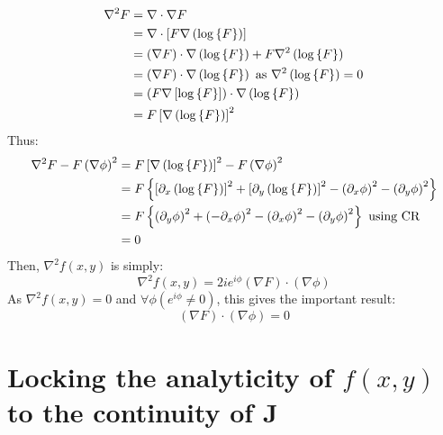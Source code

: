 \documentclass{article}
\begin{document}
\begin{align}
    \nabla^2 F &= \nabla \cdot \nabla F \\
               &= \nabla \cdot \left[ F \nabla \left( \log \left\{ F \right\} \right) \right]
    \\
    &= \left( \nabla F \right) \cdot \nabla \left( \log \left\{ F \right\} \right) + F \nabla^2
    \left( \log \left\{ F \right\} \right) \\
    &= \left( \nabla F \right) \cdot \nabla \left( \log \left\{ F \right\} \right)
    ~\textrm{as}~ \nabla^2 \left( \log \left\{ F \right\} \right) = 0 \\
    &= \left( F \nabla \left[ \log \left\{ F \right\} \right] \right) \cdot \nabla \left(
    \log \left\{ F \right\} \right) \\
    &= F \left[ \nabla \left( \log \left\{ F \right\} \right) \right]^2
\end{align}
Thus:
\begin{align}
    \nabla^2 F - F \left( \nabla \phi \right)^2 &= F \left[ \nabla \left( \log \left\{ F \right\}
        \right) \right]^2 - F \left( \nabla \phi \right)^2 \\
    &= F \left\{ \left[ \partial_x \left( \log \left\{ F \right\} \right) \right]^2
       + \left[ \partial_y \left( \log \left\{ F \right\} \right) \right]^2
       - \left( \partial_x \phi \right)^2
       - \left( \partial_y \phi \right)^2 \right\} \\
    &= F \left\{ \left( \partial_y \phi \right)^2
       + \left( - \partial_x \phi \right)^2
       - \left( \partial_x \phi \right)^2
       - \left( \partial_y \phi \right)^2 \right\} ~\textrm{using CR}\\
    &= 0
\end{align}
Then, $\nabla^2 f(x,y)$ is simply:
\begin{equation}
    \nabla^2 f(x,y) = 2 i e^{i \phi} \left( \nabla F \right) \cdot \left( \nabla
        \phi \right)
\end{equation}
As $\nabla^2 f(x,y) = 0$ and $\forall \phi \left( e^{i \phi} \neq 0 \right)$,
this gives the important result:
\begin{equation}
    \left( \nabla F \right) \cdot \left( \nabla \phi \right) = 0
\end{equation}


\section{Locking the analyticity of $f(x,y)$ to the continuity of $\mathbf{J}$}
\end{document}

